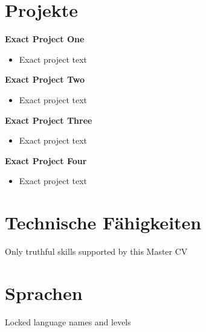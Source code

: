 \documentclass[a4paper,10pt]{article}
\begin{document}
\section*{Projekte}
\textbf{Exact Project One}\\
\begin{itemize}[leftmargin=1.5em, noitemsep]\item Exact project text\end{itemize}
\vspace{0.35em}
\textbf{Exact Project Two}\\
\begin{itemize}[leftmargin=1.5em, noitemsep]\item Exact project text\end{itemize}
\vspace{0.35em}
\textbf{Exact Project Three}\\
\begin{itemize}[leftmargin=1.5em, noitemsep]\item Exact project text\end{itemize}
\vspace{0.35em}
\textbf{Exact Project Four}\\
\begin{itemize}[leftmargin=1.5em, noitemsep]\item Exact project text\end{itemize}

\section*{Technische Fähigkeiten}
Only truthful skills supported by this Master CV

\section*{Sprachen}
Locked language names and levels
\end{document}
